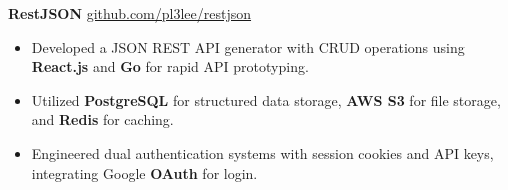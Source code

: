 \textbf{RestJSON} \hfill \href{https://github.com/pl3lee/restjson}{github.com/pl3lee/restjson} \\
\vspace{-9pt}
\begin{itemize}
  \item Developed a JSON REST API generator with CRUD operations using \textbf{React.js} and \textbf{Go} for rapid API prototyping.
  \item Utilized \textbf{PostgreSQL} for structured data storage, \textbf{AWS S3} for file storage, and \textbf{Redis} for caching.
  \item Engineered dual authentication systems with session cookies and API keys, integrating Google \textbf{OAuth} for login.
\end{itemize}